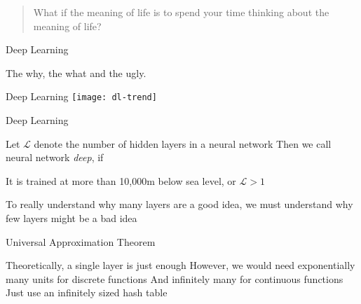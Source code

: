 

\begin{frame}
  \begin{quote}
    What if the meaning of life is to spend your time thinking about the meaning of life?
  \end{quote}
\end{frame}

\begin{frame}
  \centering
  {
    \Huge
    \color{orange}
    Deep Learning
    \vspace{0.5cm}
  }

  {
  \Large
  \pause The why\pause, the what\pause{} and the ugly.
  }
\end{frame}

\begin{slide}{Deep Learning}
  \texttt{[image: dl-trend]}
\end{slide}

\begin{slide}{Deep Learning}

  \begin{itemize}
    \pitem Let $\mathcal{L}$ denote the number of hidden layers in a neural network
    \pitem Then we call neural network \emph{deep}, if
    \begin{enumerate}
      \pitem It is trained at more than 10,000m below sea level, or
      \pitem $\mathcal{L} > 1$
    \end{enumerate}
    \pitem To really understand why many layers are a good idea, we must understand why few layers might be a bad idea
  \end{itemize}
\end{slide}

\begin{slide}{Universal Approximation Theorem}
  \begin{itemize}
    \pitem Theoretically, a single layer is just enough
    \pitem However, we would need exponentially many units for discrete functions
    \pitem And infinitely many for continuous functions
    \pitem Just use an infinitely sized hash table

  \end{itemize}
\end{slide}

